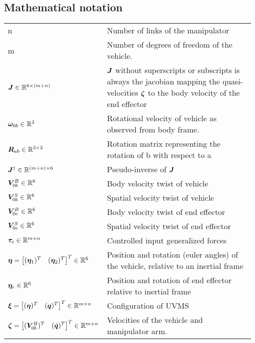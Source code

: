 \subsection*{Mathematical notation}
    \begin{longtable}{p{6cm}p{10cm}}
			n & Number of links of the manipulator \\
			m & Number of degrees of freedom of the vehicle.  \\
			$\boldsymbol J \in \mathbb{R}^{6\times (m+n)}$ & $\boldsymbol J$ without superscripts or subscripts is always the jacobian mapping the quasi-velocities $\boldsymbol \zeta$ to the body velocity of the end effector\\
			$\boldsymbol \omega_{0b} \in \mathbb{R}^{3}$ & Rotational velocity of vehicle as observed from body frame.  \\
			$\boldsymbol R_{ab} \in \mathbb{R}^{3 \times 3}$ & Rotation matrix representing the rotation of \frame b with respect to \frame a \\
			$\boldsymbol J^{\dagger} \in \mathbb{R}^{(m+n) \times 6}$ & Pseudo-inverse of $\boldsymbol J$\\
			$\boldsymbol V_{0b}^{B} \in \mathbb{R}^{6}  $ & Body velocity twist of vehicle\\
			$\boldsymbol V_{0b}^{S}\in \mathbb{R}^{6} $ & Spatial velocity twist of vehicle\\
			$\boldsymbol V_{0e}^{B}\in \mathbb{R}^{6} $ & Body velocity twist of end effector\\
			$\boldsymbol V_{0e}^{S}\in \mathbb{R}^{6} $ & Spatial velocity twist of end effector\\
			$\boldsymbol \tau_{c} \in \mathbb{R}^{m+n}$ & Controlled input generalized forces\\
			$\boldsymbol \eta = \begin{bmatrix} (\boldsymbol \eta_{1})^{T} & (\boldsymbol \eta_{2})^{T}\end{bmatrix}^{T} \in \mathbb{R}^{6}$  & Position and rotation (euler angles) of the vehicle, relative to an inertial frame \\
			$\boldsymbol \eta_{e} \in \mathbb{R}^{6}$ & Position and rotation of end effector relative to inertial frame \\ 
			$\boldsymbol \xi = \begin{bmatrix} (\boldsymbol \eta)^{T} & (\boldsymbol q)^{T}\end{bmatrix}^{T} \in \mathbb{R}^{m+n} $ &  Configuration of UVMS \\
			$\boldsymbol \zeta = \begin{bmatrix} (\boldsymbol V_{0b}^B)^{T} & (\dot{\boldsymbol q})^{T}\end{bmatrix}^{T} \in \mathbb{R}^{m+n}$ & Velocities of the vehicle and manipulator arm. \\

\end{longtable}
